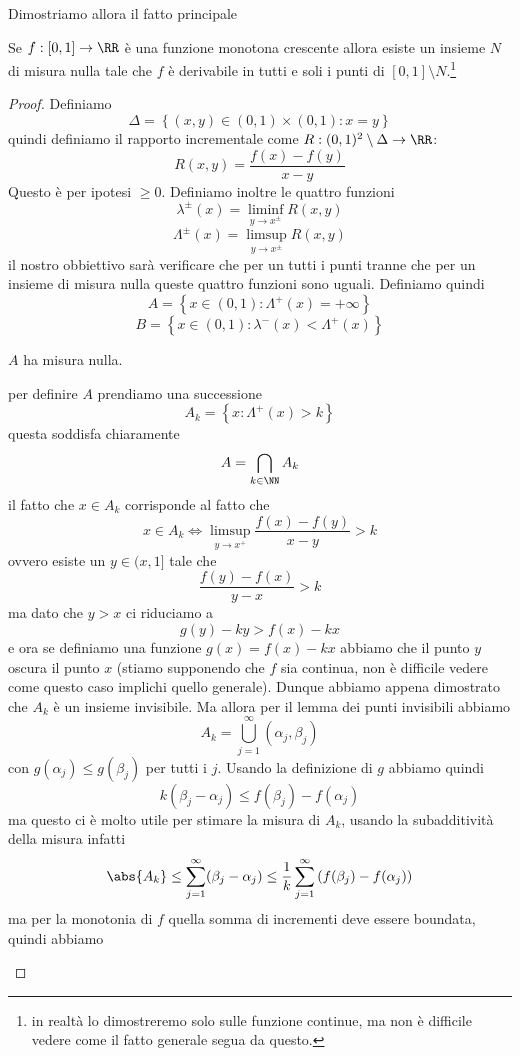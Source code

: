 \documentclass[11pt]{scrartcl}
\begin{document}
	 Dimostriamo allora il fatto principale
	 \begin{theorem}[Lebesgue]
	 	Se $f:[0,1]\to\RR$ è una funzione monotona crescente allora esiste un insieme $N$ di misura nulla tale che $f$ è derivabile in tutti e soli i punti di $[0,1]\setminus N$.\footnote{in realtà lo dimostreremo solo sulle funzione continue, ma non è difficile vedere come il fatto generale segua da questo.}
	 \end{theorem}
	 \begin{proof}
	 	Definiamo
	 	$$\Delta=\left\{(x,y)\in (0,1)\times (0,1): x=y\right\}$$
	 	quindi definiamo il rapporto incrementale come $R:(0,1)^2\setminus \Delta \to \RR$:
	 	$$R(x,y)=\frac{f(x)-f(y)}{x-y}$$
	 	Questo è per ipotesi $\ge 0$.
	 	Definiamo inoltre le quattro funzioni
	 	$$\lambda^\pm(x)=\liminf_{y\to x^\pm}R(x,y)$$
	 	$$\Lambda^\pm(x)=\limsup_{y\to x^\pm}R(x,y)$$
	 	il nostro obbiettivo sarà verificare che per un tutti i punti tranne che per un insieme di misura nulla queste quattro funzioni sono uguali. Definiamo quindi
	 	$$A=\left\{x\in(0,1):\Lambda^+(x)=+\infty\right\}$$
	 	$$B=\left\{x\in(0,1):\lambda^-(x)<\Lambda^+(x)\right\}$$
	 	\begin{claim}
	 		$A$ ha misura nulla.
	 	\end{claim}
	 	\begin{subproof}
	 		per definire $A$ prendiamo una successione
	 		$$A_k=\left\{x:\Lambda^+(x)>k\right\}$$
	 		questa soddisfa chiaramente
	 		$$A=\bigcap_{k\in\NN}A_k$$
	 		il fatto che $x\in A_k$ corrisponde al fatto che 
	 		$$x\in A_k \iff \limsup_{y\to x^+}\frac{f(x)-f(y)}{x-y}>k$$
	 		ovvero esiste un $y\in (x,1]$ tale che 
	 		$$\frac{f(y)-f(x)}{y-x}>k$$
	 		ma dato che $y>x$ ci riduciamo a 
	 		$$g(y)-ky>f(x)-kx$$
	 		e ora se definiamo una funzione $g(x)=f(x)-kx$ abbiamo che il punto $y$ oscura il punto $x$ (stiamo supponendo che $f$ sia continua, non è difficile vedere come questo caso implichi quello generale). Dunque abbiamo appena dimostrato che $A_k$ è un insieme invisibile. Ma allora per il lemma dei punti invisibili abbiamo
	 		$$A_k=\bigcup_{j=1}^\infty (\alpha_j,\beta_j)$$
	 		con $g(\alpha_j)\le g(\beta_j)$ per tutti i $j$. Usando la definizione di $g$ abbiamo quindi
	 		$$k(\beta_j-\alpha_j)\le f(\beta_j)-f(\alpha_j)$$
	 		ma questo ci è molto utile per stimare la misura di $A_k$, usando la subadditività della misura infatti
	 		$$\abs{A_k}\le \sum_{j=1}^{\infty}(\beta_j-\alpha_j)\le \frac{1}{k}\sum_{j=1}^\infty \left(f(\beta_j)-f(\alpha_j)\right)$$
	 		ma per la monotonia di $f$ quella somma di incrementi deve essere boundata, quindi abbiamo

\end{subproof}
\end{proof}
\end{document}
